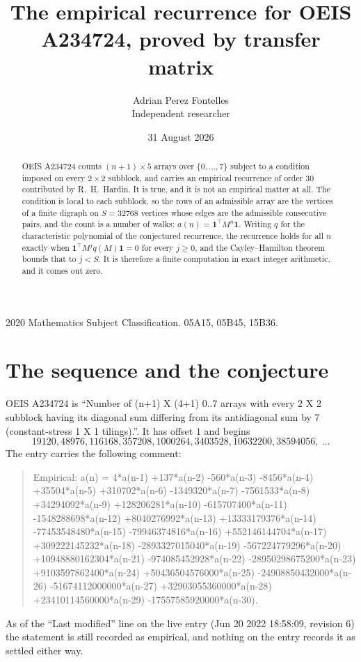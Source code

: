 \documentclass[11pt,a4paper]{article}
\title{The empirical recurrence for OEIS A234724, proved by transfer matrix}
\author{Adrian Perez Fontelles\\ \small Independent researcher}
\date{31 August 2026}
\theoremstyle{plain}
\theoremstyle{definition}
\begin{document}
\maketitle

\begin{abstract}
OEIS A234724 counts $(n+1)\times5$ arrays over $\{0,\dots,7\}$ subject to a condition imposed on
every $2\times2$ subblock, and carries an empirical recurrence of order $30$ contributed
by R.~H.~Hardin. It is true, and it is not an empirical matter at all. The condition is local
to each subblock, so the rows of an admissible array are the vertices of a finite digraph
on $S=32768$ vertices whose edges are the admissible consecutive pairs, and the count is a
number of walks: $a(n)=\mathbf{1}^{\!\top}M^{n}\mathbf{1}$. Writing $q$
for the characteristic polynomial of the conjectured recurrence, the recurrence holds for all
$n$ exactly when $\mathbf{1}^{\!\top}M^{j}q(M)\mathbf{1}=0$ for every $j\ge0$, and the
Cayley--Hamilton theorem bounds that to $j<S$. It is therefore a finite computation in exact
integer arithmetic, and it comes out zero.
\end{abstract}

\noindent\small 2020 Mathematics Subject Classification. 05A15, 05B45, 15B36.\normalsize

\section{The sequence and the conjecture}

OEIS A234724 is ``Number of (n+1) X (4+1) 0..7 arrays with every 2 X 2 subblock having its diagonal sum differing from its antidiagonal sum by 7 (constant-stress 1 X 1 tilings).''. It has offset $1$ and begins
\[
19120, 48976, 116168, 357208, 1000264, 3403528, 10632200, 38594056,\ \dots
\]
The entry carries the following comment:
\begin{quote}\small
Empirical: a(n) = 4*a(n-1) +137*a(n-2) -560*a(n-3) -8456*a(n-4) +35504*a(n-5) +310702*a(n-6) -1349320*a(n-7) -7561533*a(n-8) +34294092*a(n-9) +128206281*a(n-10) -615707400*a(n-11) -1548288698*a(n-12) +8040276992*a(n-13) +13333179376*a(n-14) -77453548480*a(n-15) -79946374816*a(n-16) +552146144704*a(n-17) +309222145232*a(n-18) -2893327015040*a(n-19) -567224779296*a(n-20) +10948880162304*a(n-21) -974085452928*a(n-22) -28950298675200*a(n-23) +9103597862400*a(n-24) +50436504576000*a(n-25) -24908850432000*a(n-26) -51674112000000*a(n-27) +32903055360000*a(n-28) +23410114560000*a(n-29) -17557585920000*a(n-30).
\end{quote}
As of the ``Last modified'' line on the live entry (Jun 20 2022 18:58:09, revision 6) the statement is
still recorded as empirical, and nothing on the entry records it as settled either way.
\end{document}
